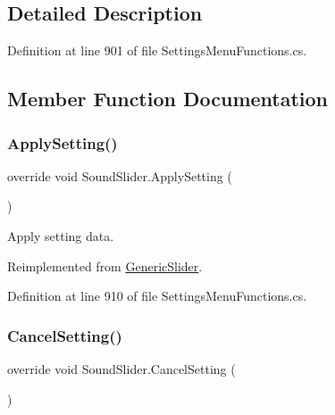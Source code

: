 \subsection{Detailed Description}


Definition at line 901 of file Settings\+Menu\+Functions.\+cs.



\subsection{Member Function Documentation}
\mbox{\label{class_sound_slider_aad9aa2977723d011072ca8bd66b15ee2}} 
\subsubsection{\texorpdfstring{Apply\+Setting()}{ApplySetting()}}
{\footnotesize\ttfamily override void Sound\+Slider.\+Apply\+Setting (\begin{DoxyParamCaption}{ }\end{DoxyParamCaption})\hspace{0.3cm}{\ttfamily [virtual]}}



Apply setting data. 



Reimplemented from \hyperlink{class_generic_slider_ae98915fdb0f94d37222e83e93f6ac814}{Generic\+Slider}.



Definition at line 910 of file Settings\+Menu\+Functions.\+cs.

\mbox{\label{class_sound_slider_a1f3ee8365022affae12b8e4866ed4db2}} 
\subsubsection{\texorpdfstring{Cancel\+Setting()}{CancelSetting()}}
{\footnotesize\ttfamily override void Sound\+Slider.\+Cancel\+Setting (\begin{DoxyParamCaption}{ }\end{DoxyParamCaption})\hspace{0.3cm}{\ttfamily [virtual]}}



